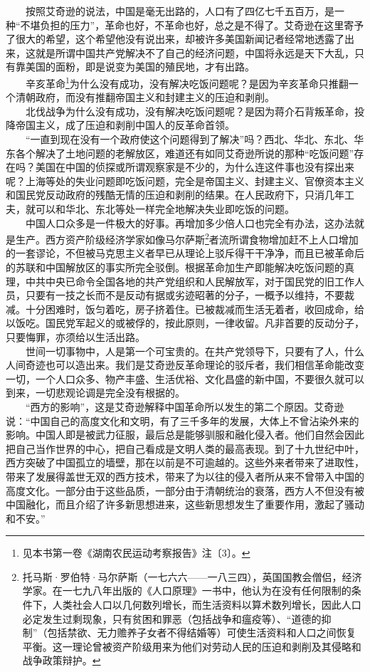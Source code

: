 \documentclass[cn,11pt,chinese]{elegantbook}
\begin{document}
　　按照艾奇逊的说法，中国是毫无出路的，人口有了四亿七千五百万，是一种“不堪负担的压力”，革命也好，不革命也好，总之是不得了。艾奇逊在这里寄予了很大的希望，这个希望他没有说出来，却被许多美国新闻记者经常地透露了出来，这就是所谓中国共产党解决不了自己的经济问题，中国将永远是天下大乱，只有靠美国的面粉，即是说变为美国的殖民地，才有出路。\\
　　辛亥革命\footnote[4]{ 见本书第一卷《湖南农民运动考察报告》注〔3〕。}为什么没有成功，没有解决吃饭问题呢？是因为辛亥革命只推翻一个清朝政府，而没有推翻帝国主义和封建主义的压迫和剥削。\\
　　北伐战争为什么没有成功，没有解决吃饭问题呢？是因为蒋介石背叛革命，投降帝国主义，成了压迫和剥削中国人的反革命首领。\\
　　“一直到现在没有一个政府使这个问题得到了解决”吗？西北、华北、东北、华东各个解决了土地问题的老解放区，难道还有如同艾奇逊所说的那种“吃饭问题”存在吗？美国在中国的侦探或所谓观察家是不少的，为什么连这件事也没有探出来呢？上海等处的失业问题即吃饭问题，完全是帝国主义、封建主义、官僚资本主义和国民党反动政府的残酷无情的压迫和剥削的结果。在人民政府下，只消几年工夫，就可以和华北、东北等处一样完全地解决失业即吃饭的问题。\\
　　中国人口众多是一件极大的好事。再增加多少倍人口也完全有办法，这办法就是生产。西方资产阶级经济学家如像马尔萨斯\footnote[5]{ 托马斯·罗伯特·马尔萨斯（一七六六——一八三四），英国国教会僧侣，经济学家。在一七九八年出版的《人口原理》一书中，他认为在没有任何限制的条件下，人类社会人口以几何数列增长，而生活资料以算术数列增长，因此人口必定发生过剩现象，只有贫困和罪恶（包括战争和瘟疫等）、“道德的抑制”（包括禁欲、无力赡养子女者不得结婚等）可使生活资料和人口之间恢复平衡。这一理论曾被资产阶级用来为他们对劳动人民的压迫和剥削及其侵略和战争政策辩护。}者流所谓食物增加赶不上人口增加的一套谬论，不但被马克思主义者早已从理论上驳斥得干干净净，而且已被革命后的苏联和中国解放区的事实所完全驳倒。根据革命加生产即能解决吃饭问题的真理，中共中央已命令全国各地的共产党组织和人民解放军，对于国民党的旧工作人员，只要有一技之长而不是反动有据或劣迹昭著的分子，一概予以维持，不要裁减。十分困难时，饭匀着吃，房子挤着住。已被裁减而生活无着者，收回成命，给以饭吃。国民党军起义的或被俘的，按此原则，一律收留。凡非首要的反动分子，只要悔罪，亦须给以生活出路。\\
　　世间一切事物中，人是第一个可宝贵的。在共产党领导下，只要有了人，什么人间奇迹也可以造出来。我们是艾奇逊反革命理论的驳斥者，我们相信革命能改变一切，一个人口众多、物产丰盛、生活优裕、文化昌盛的新中国，不要很久就可以到来，一切悲观论调是完全没有根据的。\\
　　“西方的影响”，这是艾奇逊解释中国革命所以发生的第二个原因。艾奇逊说：“中国自己的高度文化和文明，有了三千多年的发展，大体上不曾沾染外来的影响。中国人即是被武力征服，最后总是能够驯服和融化侵入者。他们自然会因此把自己当作世界的中心，把自己看成是文明人类的最高表现。到了十九世纪中叶，西方突破了中国孤立的墙壁，那在以前是不可逾越的。这些外来者带来了进取性，带来了发展得盖世无双的西方技术，带来了为以往的侵入者所从来不曾带入中国的高度文化。一部分由于这些品质，一部分由于清朝统治的衰落，西方人不但没有被中国融化，而且介绍了许多新思想进来，这些新思想发生了重要作用，激起了骚动和不安。”\\
\end{document}

